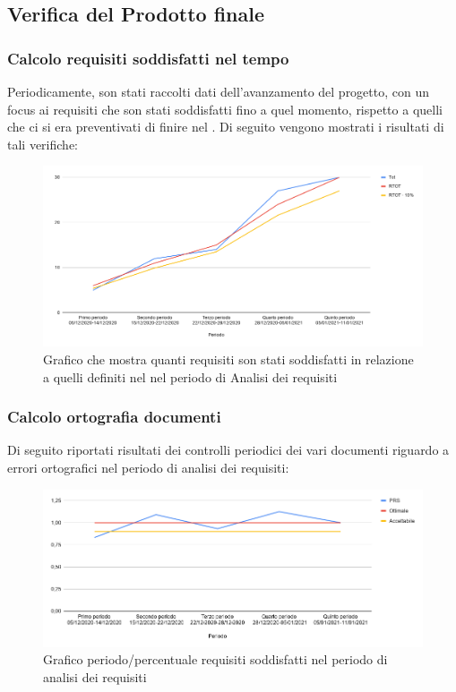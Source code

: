 \subsection{Verifica del Prodotto finale}	
	\subsubsection{Calcolo requisiti soddisfatti nel tempo}
		Periodicamente, son stati raccolti dati dell'avanzamento del progetto, con un focus ai requisiti che son stati soddisfatti fino a quel momento, rispetto a quelli che ci si era preventivati di finire nel .
		Di seguito vengono mostrati i risultati di tali verifiche:
		\begin{figure}[H]
			\centering
			\includegraphics[width=0.8\linewidth]{./res/images/rtot.png}
			\caption{Grafico che mostra quanti requisiti son stati soddisfatti in relazione a quelli definiti nel  nel periodo di Analisi dei requisiti}
			\label{fig:Grafico requisiti soddisfatti nel periodo di Analisi dei Requisiti}
		\end{figure}

		\subsubsection{Calcolo ortografia documenti}
		Di seguito riportati risultati dei controlli periodici dei vari documenti riguardo a errori ortografici nel periodo di analisi dei requisiti:
		\begin{figure}[H]
			\centering
			\includegraphics[width=0.8\linewidth]{./res/images/prs.png}
			\caption{Grafico periodo/percentuale requisiti soddisfatti nel periodo di analisi dei requisiti}
			\label{fig:Grafico PRS periodo di analisi dei requisiti}
		\end{figure}


